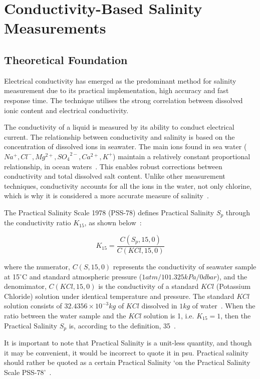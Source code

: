 \section{Conductivity-Based Salinity Measurements}
\subsection{Theoretical Foundation}
Electrical conductivity has emerged as the predominant method for salinity measurement due to its practical implementation, high accuracy and fast response time.
The technique utilises the strong correlation between dissolved ionic content and electrical conductivity.

The conductivity of a liquid is measured by its ability to conduct electrical current.
The relationship between conductivity and salinity is based on the concentration of dissolved ions in seawater.
The main ions found in sea water ($Na^+, Cl^-, Mg^{2+}, {SO_4}^{2-}, Ca^{2+}, K^+$) maintain a relatively constant proportional relationship, in ocean waters~\cite{chemical_ocean}.
This enables robust corrections between conductivity and total dissolved salt content.
Unlike other measurement techniques, conductivity accounts for all the ions in the water, not only chlorine, which is why it is considered a more accurate measure of salinity~\cite{salinity_def_calc}.

The Practical Salinity Scale 1978 (PSS-78) defines Practical Salinity $S_p$ through the conductivity ratio $K_{15}$, as shown below~\cite{teos-10}:

\begin{equation}\label{eqn:k15_salinity}
    K_{15} = \frac{C(S_p, 15, 0)}{C(KCl, 15, 0)}
\end{equation}

where the numerator, $C(S, 15, 0)$ represents the conductivity of seawater sample at 15$^\circ$C and standard atmospheric pressure ($1 atm/101.325 kPa/0dbar$), and the denomimator, $C(KCl, 15, 0)$ is the conductivity of a standard $KCl$ (Potassium Chloride) solution under identical temperature and pressure.
The standard $KCl$ solution consists of $32.4356 \times 10^{-3}kg$ of $KCl$ dissolved in $1kg$ of water~\cite{lewis_pss78}.
When the ratio between the water sample and the $KCl$ solution is 1, i.e. $K_{15} = 1$, then the Practical Salinity $S_p$ is, according to the definition, 35~\cite{teos-10}.

It is important to note that Practical Salinity is a unit-less quantity, and though it may be convenient, it would be incorrect to quote it in \gls{psu}. 
Practical salinity should rather be quoted as a certain Practical Salinity `on the Practical Salinity Scale PSS-78'~\cite{teos-10}. 

